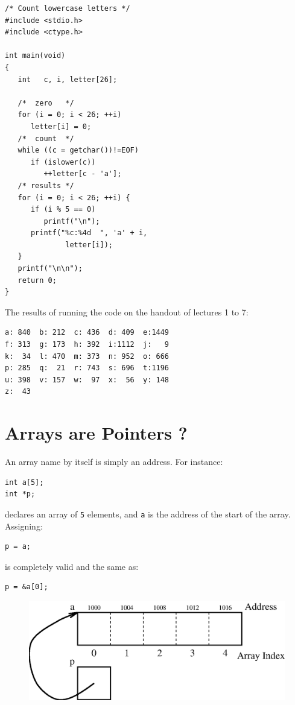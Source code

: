 \documentclass[a4,portraitt]{slides}
\begin{document}
\newpage
{\samepage
\begin{verbatim}
/* Count lowercase letters */
#include <stdio.h>
#include <ctype.h>

int main(void)
{
   int   c, i, letter[26];

   /*  zero   */
   for (i = 0; i < 26; ++i)
      letter[i] = 0;
   /*  count  */
   while ((c = getchar())!=EOF)
      if (islower(c))
         ++letter[c - 'a'];
   /* results */
   for (i = 0; i < 26; ++i) {
      if (i % 5 == 0)
         printf("\n");
      printf("%c:%4d  ", 'a' + i,
              letter[i]);
   }
   printf("\n\n");
   return 0;
}
\end{verbatim}
}
\newpage
The results of running the code on
the handout of lectures 1 to 7:
\begin{verbatim}
a: 840  b: 212  c: 436  d: 409  e:1449
f: 313  g: 173  h: 392  i:1112  j:   9
k:  34  l: 470  m: 373  n: 952  o: 666
p: 285  q:  21  r: 743  s: 696  t:1196
u: 398  v: 157  w:  97  x:  56  y: 148
z:  43
\end{verbatim}
\newpage
{\samepage
\section*{Arrays are Pointers ?}
\vspace{-1em}
An array name by itself is simply an address.
For instance:
\begin{verbatim}
int a[5];
int *p;
\end{verbatim}
declares an array of \verb^5^ elements, and
\verb^a^ is the address of the start of the
array.
Assigning:
\vspace{-1em}
\begin{verbatim}
p = a;
\end{verbatim}
\vspace{-1em}
is completely valid and
the same as:
\vspace{-1em}
\begin{verbatim}
p = &a[0];
\end{verbatim}

\begin{center}
\begin{figure}[ht]
\centerline{
\includegraphics{../Figs/array9_2.eps}
}
\end{figure}
\end{center}
}
\end{document}
